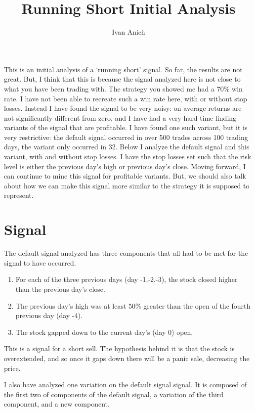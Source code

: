 \documentclass{article}
\title{Running Short Initial Analysis}
\author{Ivan Anich}
\begin{document}
\maketitle

This is an initial analysis of a `running short' signal. So far, the results are not great. But, I think that this is because the signal analyzed here is not close to what you have been trading with. The strategy you showed me had a 70\% win rate. I have not been able to recreate such a win rate here, with or without stop losses. Instead I have found the signal to be very noisy: on average returns are not significantly different from zero, and I have had a very hard time finding variants of the signal that are profitable. I have found one such variant, but it is very restrictive: the default signal occurred in over 500 trades across 100 trading days, the variant only occurred in 32. Below I analyze the default signal and this variant, with and without stop losses. I have the stop losses set such that the risk level is either the previous day's high or previous day's close. Moving forward, I can continue to mine this signal for profitable variants. But, we should also talk about how we can make this signal more similar to the strategy it is supposed to represent.

\section{Signal}

The default signal analyzed has three components that all had to be met for the signal to have occurred.

\begin{enumerate}
	\item For each of the three previous days (day -1,-2,-3), the stock closed higher than the previous day's close.
	\item The previous day's high was at least 50\% greater than the open of the fourth previous day (day -4).
	\item The stock gapped down to the current day's (day 0) open.
\end{enumerate}

This is a signal for a short sell. The hypothesis behind it is that the stock is overextended, and so once it gaps down there will be a panic sale, decreasing the price.

I also have analyzed one variation on the default signal signal. It is composed of the first two of components of the default signal, a variation of the third component, and a new component.
\end{document}
